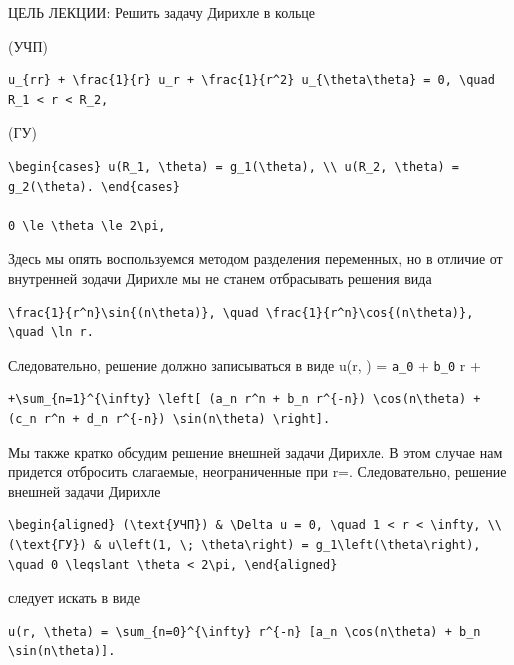 \documentclass[
  ukrainian,
]{article}
\begin{document}
ЦЕЛЬ ЛЕКЦИИ: Решить задачу Дирихле в кольце

(УЧП)

\begin{verbatim}
u_{rr} + \frac{1}{r} u_r + \frac{1}{r^2} u_{\theta\theta} = 0, \quad R_1 < r < R_2,
\end{verbatim}

(ГУ)

\begin{verbatim}
\begin{cases} u(R_1, \theta) = g_1(\theta), \\ u(R_2, \theta) = g_2(\theta). \end{cases}

0 \le \theta \le 2\pi,
\end{verbatim}

Здесь мы опять воспользуемся методом разделения переменных, но в отличие
от внутренней зодачи Дирихле мы не станем отбрасывать решения вида

\begin{verbatim}
\frac{1}{r^n}\sin{(n\theta)}, \quad \frac{1}{r^n}\cos{(n\theta)}, \quad \ln r.
\end{verbatim}

Следовательно, решение должно записываться в виде u(r, \theta) =
\texttt{a\_0} + \texttt{b\_0} \ln r +

\begin{verbatim}
+\sum_{n=1}^{\infty} \left[ (a_n r^n + b_n r^{-n}) \cos(n\theta) + (c_n r^n + d_n r^{-n}) \sin(n\theta) \right].
\end{verbatim}

Мы также кратко обсудим решение внешней задачи Дирихле. В этом случае
нам придется отбросить слагаемые, неограниченные при r=\infty  .
Следовательно, решение внешней задачи Дирихле

\begin{verbatim}
\begin{aligned} (\text{УЧП}) & \Delta u = 0, \quad 1 < r < \infty, \\ (\text{ГУ}) & u\left(1, \; \theta\right) = g_1\left(\theta\right), \quad 0 \leqslant \theta < 2\pi, \end{aligned}
\end{verbatim}

следует искать в виде

\begin{verbatim}
u(r, \theta) = \sum_{n=0}^{\infty} r^{-n} [a_n \cos(n\theta) + b_n \sin(n\theta)].
\end{verbatim}
\end{document}
